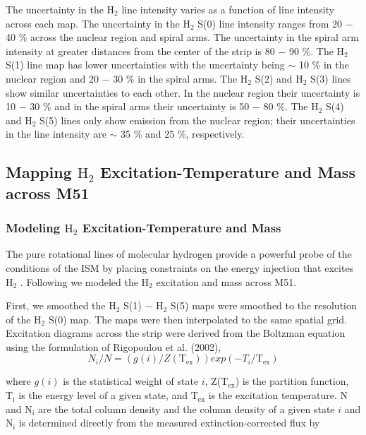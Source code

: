 \documentclass[manuscript]{aastex}
\begin{document}
The uncertainty in the $\mathrm{H_2}$ line intensity varies as a
function of line intensity across each map.  The uncertainty in the
$\mathrm{H_2}$ S(0) line intensity ranges from 20 $-$ 40 \% across the
nuclear region and spiral arms.  The uncertainty in the spiral arm
intensity at greater distances from the center of the strip is 80 $-$
90 \%.  The $\mathrm{H_2}$ S(1) line map has lower uncertainties with
the uncertainty being $\sim$ 10 \% in the nuclear region and 20 $-$ 30
\% in the spiral arms.  The $\mathrm{H_2}$ S(2) and $\mathrm{H_2}$
S(3) lines show similar uncertainties to each other.  In the nuclear
region their uncertainty is 10 $-$ 30 \% and in the spiral arms their
uncertainty is 50 $-$ 80 \%.  The $\mathrm{H_2}$ S(4) and
$\mathrm{H_2}$ S(5) lines only show emission from the nuclear region;
their uncertainties in the line intensity are $\sim$ 35 \% and 25 \%,
respectively.

\subsection{Mapping $\mathrm{H_2}$ Excitation-Temperature and Mass across M51}

\subsubsection{Modeling $\mathrm{H_2}$ Excitation-Temperature and Mass}

The pure rotational lines of molecular hydrogen provide a powerful
probe of the conditions of the ISM by placing constraints on the
energy injection that excites $\mathrm{H_2}$ \citep{neu06}.  Following
\citet{rig02, hig06} we modeled the $\mathrm{H_2}$ excitation and mass
across M51.

First, we smoothed the $\mathrm{H_2}$ S(1) $-$ $\mathrm{H_2}$ S(5)
maps were smoothed to the resolution of the $\mathrm{H_2}$ S(0) map.
The maps were then interpolated to the same spatial grid.  Excitation
diagrams across the strip were derived from the Boltzman equation
using the formulation of Rigopoulou et al. (2002),
\begin{equation}
N_i/N = (g(i)/Z(\mathrm{T_{ex}}))exp(-T_i/\mathrm{T_{ex}})
\end{equation}

where $g(i)$ is the statistical weight of state $i$,
Z($\mathrm{T_{ex}}$) is the partition function, $\mathrm{T_i}$ is the
energy level of a given state, and $\mathrm{T_{ex}}$ is the excitation
temperature.  N and $\mathrm{N_i}$ are the total column density and
the column density of a given state $i$ and $\mathrm{N_i}$ is
determined directly from the measured extinction-corrected flux by
\end{document}
